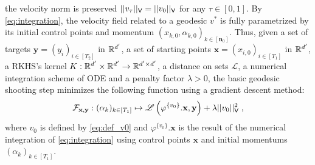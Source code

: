   the velocity norm is preserved $||v_\tau||_{\mathsf{V}}=||v_0||_{\mathsf{V}} $ for any $\tau\in [0,1]$.
   By \eqref{eq:integration}, the velocity field related to a geodesic $v^*$ is fully parametrized by its initial control points and momentum $(x_{k,0},\alpha_{k,0})_{k\in[\mathbf{n}_0]}$.
   Thus, given a set of targets $\mathbf{y}=(y_i)_{i\in[T_2]}$ in $\mathbb{R}^{d'}$, a set of starting points $\mathbf{x}=(x_{i,0})_{i\in[T_1]}$ in $\mathbb{R}^{d'}$, a RKHS's kernel $K:\mathbb{R}^{d'}\times \mathbb{R}^{d'}\to \mathbb{R}^{d'\times d'}$, a distance on sets $\mathscr{L}$, 
 a numerical integration scheme of ODE and a penalty factor $\lambda>0$, the basic geodesic shooting step minimizes the following function using a gradient descent method:
   \begin{equation}
    \label{eq:relaxation}
    \mathcal{F}_{\mathbf{x},\mathbf{y}}: (\alpha_k)_{k\in [T_1]}\mapsto \mathscr{L}\left(\varphi^{\{v_0\}}.\mathbf{x},\mathbf{y}\right)+\lambda||v_0||_{\mathsf{V}}^2 \;,  
   \end{equation}
   where $v_0$ is defined by \eqref{eq:def_v0} and $\varphi^{\{v_0\}}.\mathbf{x}$ is the result of the numerical integration of \eqref{eq:integration} using control points $\mathbf{x}$ and initial momentums $(\alpha_k)_{k\in[T_1]} $. 





  
   
  
  



